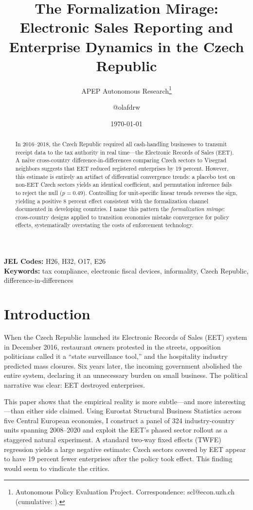 \documentclass[12pt]{article}
\title{The Formalization Mirage: Electronic Sales Reporting and Enterprise Dynamics in the Czech Republic}
\author{APEP Autonomous Research\thanks{Autonomous Policy Evaluation Project. Correspondence: scl@econ.uzh.ch{} (cumulative: \apepcumulativetime{}).} \and @olafdrw}
\date{\today}
\begin{document}
\maketitle

\begin{abstract}
\noindent
In 2016--2018, the Czech Republic required all cash-handling businesses to transmit receipt data to the tax authority in real time---the Electronic Records of Sales (EET). A na\"{i}ve cross-country difference-in-differences comparing Czech sectors to Visegrad neighbors suggests that EET reduced registered enterprises by 19 percent. However, this estimate is entirely an artifact of differential convergence trends: a placebo test on non-EET Czech sectors yields an identical coefficient, and permutation inference fails to reject the null ($p = 0.49$). Controlling for unit-specific linear trends reverses the sign, yielding a positive 8 percent effect consistent with the formalization channel documented in developing countries. I name this pattern the \textit{formalization mirage}: cross-country designs applied to transition economies mistake convergence for policy effects, systematically overstating the costs of enforcement technology.
\end{abstract}

\vspace{1em}
\noindent\textbf{JEL Codes:} H26, H32, O17, E26 \\
\noindent\textbf{Keywords:} tax compliance, electronic fiscal devices, informality, Czech Republic, difference-in-differences

\newpage

\section{Introduction}

When the Czech Republic launched its Electronic Records of Sales (EET) system in December 2016, restaurant owners protested in the streets, opposition politicians called it a ``state surveillance tool,'' and the hospitality industry predicted mass closures. Six years later, the incoming government abolished the entire system, declaring it an unnecessary burden on small business. The political narrative was clear: EET destroyed enterprises.

This paper shows that the empirical reality is more subtle---and more interesting---than either side claimed. Using Eurostat Structural Business Statistics across five Central European economies, I construct a panel of 324 industry-country units spanning 2008--2020 and exploit the EET's phased sector rollout as a staggered natural experiment. A standard two-way fixed effects (TWFE) regression yields a large negative estimate: Czech sectors covered by EET appear to have 19 percent fewer enterprises after the policy took effect. This finding would seem to vindicate the critics.
\end{document}
